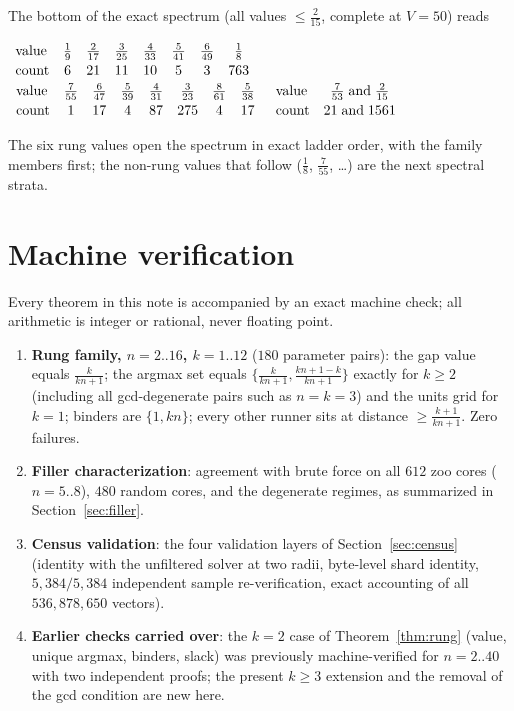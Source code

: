 \documentclass[11pt,a4paper]{article}
\theoremstyle{plain}
\theoremstyle{definition}
\theoremstyle{remark}
\begin{document}
The bottom of the exact spectrum (all values $\le \tfrac{2}{15}$, complete
at $V = 50$) reads
\begin{center}\small
$\begin{array}[t]{lccccccc}
\text{value} & \tfrac19 & \tfrac2{17} & \tfrac3{25} & \tfrac4{33} &
\tfrac5{41} & \tfrac6{49} & \tfrac18 \\[2pt]
\text{count} & 6 & 21 & 11 & 10 & 5 & 3 & 763
\end{array}$\qquad
$\begin{array}[t]{lccccccc}
\text{value} & \tfrac7{55} & \tfrac6{47} & \tfrac5{39} & \tfrac4{31} &
\tfrac3{23} & \tfrac8{61} & \tfrac5{38} \\[2pt]
\text{count} & 1 & 17 & 4 & 87 & 275 & 4 & 17
\end{array}$\qquad
$\begin{array}[t]{lc}
\text{value} & \tfrac7{53} \;\text{and}\; \tfrac2{15} \\[2pt]
\text{count} & 21 \;\text{and}\; 1561
\end{array}$
\end{center}
The six rung values open the spectrum in exact ladder order, with the
family members first; the non-rung values that follow ($\tfrac18$,
$\tfrac7{55}$, \dots) are the next spectral strata.

\section{Machine verification}\label{sec:machine}

Every theorem in this note is accompanied by an exact machine check; all
arithmetic is integer or rational, never floating point.

\begin{enumerate}[label=\textbf{M\arabic*.}, leftmargin=*]
\item \textbf{Rung family, $n = 2..16$, $k = 1..12$} ($180$ parameter
pairs): the gap value equals $\tfrac{k}{kn+1}$; the argmax set equals
$\{\tfrac{k}{kn+1}, \tfrac{kn+1-k}{kn+1}\}$ exactly for $k \ge 2$
(including all gcd-degenerate pairs such as $n = k = 3$) and the units grid
for $k = 1$; binders are $\{1, kn\}$; every other runner sits at distance
$\ge \tfrac{k+1}{kn+1}$. Zero failures.
\item \textbf{Filler characterization}: agreement with brute force on all
$612$ zoo cores ($n = 5..8$), $480$ random cores, and the degenerate
regimes, as summarized in Section~\ref{sec:filler}.
\item \textbf{Census validation}: the four validation layers of
Section~\ref{sec:census} (identity with the unfiltered solver at two
radii, byte-level shard identity, $5{,}384/5{,}384$ independent sample
re-verification, exact accounting of all $536{,}878{,}650$ vectors).
\item \textbf{Earlier checks carried over}: the $k = 2$ case of
Theorem~\ref{thm:rung} (value, unique argmax, binders, slack) was
previously machine-verified for $n = 2..40$ with two independent proofs;
the present $k \ge 3$ extension and the removal of the gcd condition are
new here.
\end{enumerate}
\end{document}
